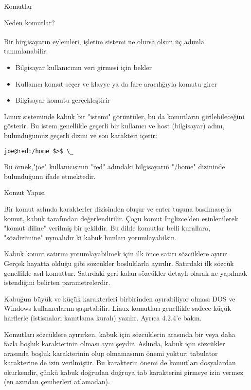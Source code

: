 \begin{section}{Komutlar}
\begin{subsection}{Neden komutlar?}
\paragraph{}{Bir birgisayarın eylemleri, işletim sistemi ne olursa olsun üç adımla tanımlanabilir:
\begin{itemize}
 \item Bilgisayar kullanıcının veri girmesi için bekler
 \item Kullanıcı komut seçer ve klavye ya da fare aracılığıyla komutu girer
 \item Bilgisayar komutu gerçekleştirir
\end{itemize}}

Linux sisteminde kabuk bir "istemi" görüntüler, bu da komutların girilebileceğini gösterir. Bu istem genellikle geçerli bir kullanıcı ve host (bilgisayar) adını, bulunduğumuz geçerli dizini ve son karakteri içerir:
\begin{verbatim}joe@red:/home $>$ \_
\end{verbatim}

Bu örnek,"joe" kullanıcısının "red" adındaki bilgisayarın "/home" dizininde bulunduğunu ifade etmektedir.
\end{subsection}
\begin{subsection}{Komut Yapısı}

Bir komut aslında karakterler dizisinden oluşur ve enter tuşuna basılmasıyla komut, kabuk tarafından değerlendirilir. Çogu komut Inglizce'den esinlenilerek "komut diline" verilmiş bir şekildir. Bu dilde komutlar belli kurallara, "sözdizimine" uymalıdır ki kabuk bunları yorumlayabilsin.

Kabuk komut satırını yorumlayabilmek için ilk önce satırı sözcüklere ayırır. Gerçek hayatta olduğu gibi sözcükler bosluklarla ayırılır. Satırdaki ilk sözcük genellikle asıl komuttur. Satırdaki geri kalan sözcükler detaylı olarak ne yapılmak istendiğini belirten parametrelerdir.

Kabuğun büyük ve küçük karakterleri birbirinden ayırabiliyor olması DOS ve Windows kullanıcılarını şaşırtabilir. Linux komutları genellikle sadece küçük harflerle (istisnaları kanıtlama kuralı) yazılır. Ayrıca 4.2.4'e bakın.

Komutları sözcüklere ayırırken, kabuk için sözcüklerin arasında bir veya daha fazla boşluk karakterinin olması aynı şeydir. Aslında, kabuk için sözcükler arasında boşluk karakterinin olup olmamasının önemi yoktur; tabulator karakterine de izin verilmiştir. Bu karakterin önemi de komutları dosyalardan okurkendir, çünkü kabuk doğrudan doğruya tab karakterini girmeye izin vermez (en azından çemberleri atlamadan).


\end{subsection}
\end{section}

